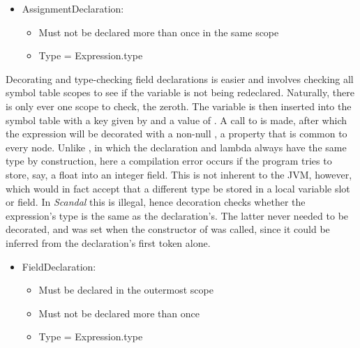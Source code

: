 \begin{itemize}
	\item AssignmentDeclaration:
		\begin{itemize}
			\item Must not be declared more than once in the same scope
			\item Type = Expression.type
		\end{itemize}
\end{itemize}

Decorating and type-checking field declarations is easier and involves checking all symbol table scopes to see if the variable is not being redeclared. Naturally, there is only ever one scope to check, the zeroth. The variable is then inserted into the symbol table with a key given by  and a value of . A call to  is made, after which the expression will be decorated with a non-null , a property that is common to every node. Unlike , in which the declaration and lambda always have the same type by construction, here a compilation error occurs if the program tries to store, say, a float into an integer field. This is not inherent to the JVM, however, which would in fact accept that a different type be stored in a local variable slot or field. In \emph{Scandal} this is illegal, hence decoration checks whether the expression's type is the same as the declaration's. The latter never needed to be decorated, and was set when the constructor of  was called, since it could be inferred from the declaration's first token alone.

\begin{itemize}
	\item FieldDeclaration:
		\begin{itemize}
			\item Must be declared in the outermost scope
			\item Must not be declared more than once
			\item Type = Expression.type
		\end{itemize}
\end{itemize}

